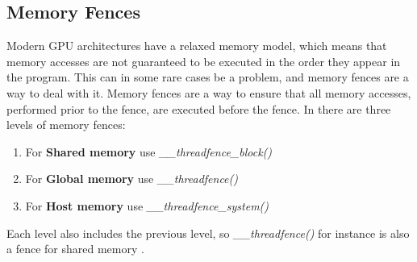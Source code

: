 \subsection{Memory Fences}
Modern GPU architectures have a relaxed memory model, which means that memory accesses are not guaranteed to be executed in the order they appear in the program.
This can in some rare cases be a problem, and memory fences are a way to deal with it.
Memory fences are a way to ensure that all memory accesses, performed prior to the fence, are executed before the fence.
In \cuda{} there are three levels of memory fences:
\begin{enumerate}
	\item For \textbf{Shared memory} use \textit{\_\_threadfence\_block()}
	\item For \textbf{Global memory} use \textit{\_\_threadfence()}
	\item For \textbf{Host memory} use \textit{\_\_threadfence\_system()}
\end{enumerate}
Each level also includes the previous level, so \textit{\_\_threadfence()} for instance is also a fence for shared memory \cite{cuda:programmingguide}.